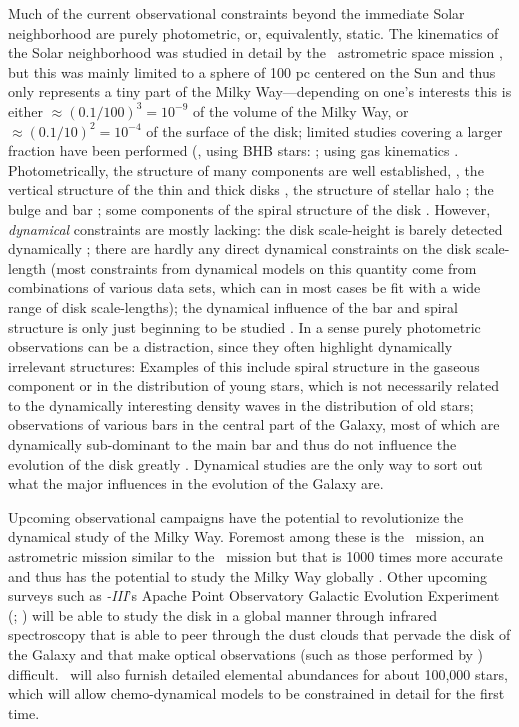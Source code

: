 Much of the current observational constraints beyond the immediate
Solar neighborhood are purely photometric, or, equivalently,
static. The kinematics of the Solar neighborhood was studied in detail
by the \Hipparcos\ astrometric space mission \citep{ESA97a}, but this
was mainly limited to a sphere of 100 pc centered on the Sun and thus
only represents a tiny part of the Milky Way---depending on one's
interests this is either $\approx (0.1/100)^3 = 10^{-9}$ of the volume
of the Milky Way, or $\approx (0.1/10)^2 = 10^{-4}$ of the surface of
the disk; limited studies covering a larger fraction have been
performed (\eg, using BHB stars: \citealt{Xue08a}; using gas
kinematics \citealt{Merrifield92a}. Photometrically, the structure of
many components are well established, \eg, the vertical structure of
the thin and thick disks \citep{Juric08a}, the structure of stellar
halo \citep{deJong10a}; the bulge and bar \citep{Blitz91a}; some
components of the spiral structure of the
disk \citep{Benjamin05a}. However, \emph{dynamical} constraints are
mostly lacking: the disk scale-height is barely detected dynamically
\citep{Kuijken89a,Siebert03a}; there are hardly any
direct dynamical constraints on the disk scale-length (most
constraints from dynamical models on this quantity come from
combinations of various data sets, which can in most cases be fit with
a wide range of disk scale-lengths); the dynamical influence of the
bar and spiral structure is only just beginning to be
studied \citep[\eg,][]{dehnen00a,fux01a,deSimone04a,Quillen05a,Antoja09a}. In
a sense purely photometric observations can be a distraction, since
they often highlight dynamically irrelevant structures: Examples of
this include spiral structure in the gaseous component or in the
distribution of young stars, which is not necessarily related to the
dynamically interesting density waves in the distribution of old
stars; observations of various bars in the central part of the Galaxy,
most of which are dynamically sub-dominant to the main bar and thus do
not influence the evolution of the disk
greatly \citep[\eg][]{Nishiyama05a,Benjamin05a,Lopez07a,Green11a}. Dynamical
studies are the only way to sort out what the major influences in the
evolution of the Galaxy are.

Upcoming observational campaigns have the potential to revolutionize
the dynamical study of the Milky Way. Foremost among these is
the \Gaia\ mission, an astrometric mission similar to the \Hipparcos\
mission but that is 1000 times more accurate and thus has the
potential to study the Milky Way
globally \citep{2001A&A...369..339P}. Other upcoming surveys such
as \sdss\emph{-III}'s Apache Point Observatory Galactic Evolution
Experiment (\apogee; \citealt{Eisenstein11a}) will be able to study
the disk in a global manner through infrared spectroscopy that is able
to peer through the dust clouds that pervade the disk of the Galaxy
and that make optical observations (such as those performed by \Gaia)
difficult. \apogee\ will also furnish detailed elemental abundances
for about 100,000 stars, which will allow chemo-dynamical models to be
constrained in detail for the first time.

